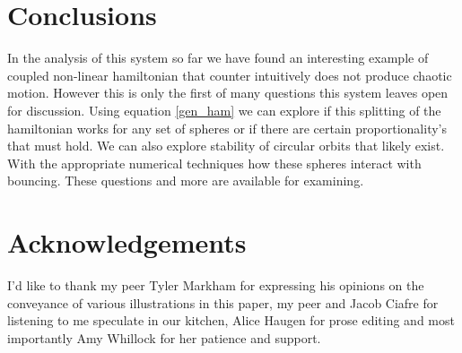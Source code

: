 \documentclass[prbg,preprint]{revtex4-1}
\begin{document}
\section{Conclusions}

In the analysis of this system so far we have found an interesting example of coupled non-linear hamiltonian that counter intuitively does not produce chaotic motion. However this is only the first of many questions this system leaves open for discussion. Using equation \ref{gen_ham} we can explore if this splitting of the hamiltonian works for any set of spheres or if there are certain proportionality's that must hold. We can also explore stability of circular orbits that likely exist. With the appropriate numerical techniques how these spheres interact with bouncing. These questions and more are available for examining.

\section{Acknowledgements}

I'd like to thank my peer Tyler Markham for expressing his opinions on the conveyance of various illustrations in this paper, my peer and Jacob Ciafre for listening to me speculate in our kitchen, Alice Haugen for prose editing and most importantly Amy Whillock for her patience and support.




\end{document}
